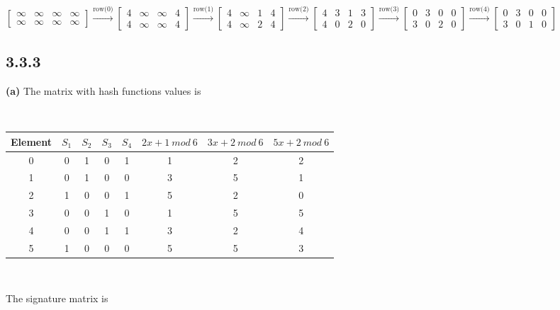 \documentclass[a4paper, 11pt]{article}
\begin{document}
$\begin{bmatrix}
\infty & \infty & \infty & \infty \\
\infty & \infty & \infty & \infty
\end{bmatrix} \xrightarrow{\text{row(0)}}
\begin{bmatrix}
4 & \infty & \infty & 4 \\
4 & \infty & \infty & 4
\end{bmatrix} \xrightarrow{\text{row(1)}}
\begin{bmatrix}
4 & \infty & 1 & 4 \\
4 & \infty & 2 & 4
\end{bmatrix} \xrightarrow{\text{row(2)}}
\begin{bmatrix}
4 & 3 & 1 & 3 \\
4 & 0 & 2 & 0
\end{bmatrix} \xrightarrow{\text{row(3)}}
\begin{bmatrix}
0 & 3 & 0 & 0 \\
3 & 0 & 2 & 0
\end{bmatrix} \xrightarrow{\text{row(4)}}
\begin{bmatrix}
0 & 3 & 0 & 0 \\
3 & 0 & 1 & 0
\end{bmatrix}
$

\subsection*{3.3.3}

\textbf{(a)} The matrix with hash functions values is

\

\begin{tabular}{c|c|c|c|c|c|c|c} 
Element & $S_1$ & $S_2$ & $S_3$ & $S_4$ & $2x + 1 \ mod \ 6$ & $3x + 2 \ mod \ 6$ & $5x + 2 \ mod \ 6$ \\ 
\hline 
0 & 0 & 1 & 0 & 1 & 1 & 2 & 2 \\ 
1 & 0 & 1 & 0 & 0 & 3 & 5 & 1 \\ 
2 & 1 & 0 & 0 & 1 & 5 & 2 & 0 \\ 
3 & 0 & 0 & 1 & 0 & 1 & 5 & 5 \\ 
4 & 0 & 0 & 1 & 1 & 3 & 2 & 4 \\ 
5 & 1 & 0 & 0 & 0 & 5 & 5 & 3 \\
\end{tabular} 

\

The signature matrix is

\
\end{document}
